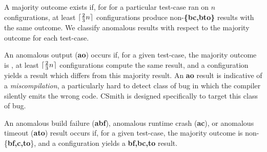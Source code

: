A majority outcome exists if, for for a particular test-case ran on $n$ configurations, at least $\lceil\frac{2}{3}n\rceil$ configurations produce non-\textbf{\{bc,bto\}} results with the same outcome. We classify anomalous results with respect to the majority outcome for each test-case.

An anomalous output (\textbf{ao}) occurs if, for a given test-case, the majority outcome is \textbf{\cmark}, at least $\lceil\frac{2}{3}n\rceil$ configurations compute the same result, and a configuration yields a result which differs from this majority result. An \textbf{ao} result is indicative of a \emph{miscompilation}, a particularly hard to detect class of bug in which the compiler silently emits the wrong code. CSmith is designed specifically to target this class of bug.

An anomalous build failure (\textbf{abf}), anomalous runtime crash (\textbf{ac}), or anomalous timeout (\textbf{ato}) result occurs if, for a given test-case, the majority outcome is non-\{\textbf{bf,c,to}\}, and a configuration yields a \textbf{bf,bc,to} result.


%


